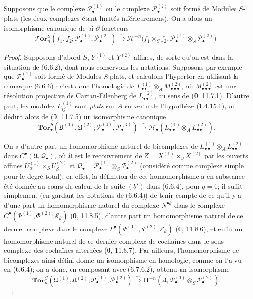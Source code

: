 \begin{proposition}[6.7.6]
Supposons que le complexe $\mathscr P_\bullet^{(1)}$ ou le complexe
$\mathscr P_\bullet^{(2)}$ soit formé de Modules $S$-plats (les deux complexes
étant limités inférieurement). On a alors un isomorphisme canonique de
bi-$\partial$-foncteurs
\[
  \boldsymbol{\mathscr{T}\!or}_n^S
  (f_1,f_2;\mathscr P_\bullet^{(1)},\mathscr P_\bullet^{(2)})
  \xrightarrow{\sim}
  \mathcal H^{-n}\bigl(f_1\times_S f_2,
    \mathscr P_\bullet^{(1)}\otimes_S\mathscr P_\bullet^{(2)}\bigr).
  \tag{6.7.6.1}\label{III.6.7.6.1.fr}
\]
\end{proposition}

\begin{proof}
Supposons d'abord $S$, $Y^{(1)}$ et $Y^{(2)}$ affines, de sorte qu'on est
dans la situation de (6.6.2), dont nous conservons les notations. Supposons par
exemple que $\mathscr P_\bullet^{(1)}$ soit formé de Modules $S$-plats, et
calculons l'hypertor en utilisant la remarque (6.6.6) : c'est donc l'homologie
de $L_{\bullet\bullet}^{(1)}\otimes_A M_{\bullet\bullet\bullet}^{(2)}$, où
$M_{\bullet\bullet\bullet}^{(2)}$ est une résolution projective de
Cartan-Eilenberg de $L_{\bullet\bullet}^{(2)}$, au sens de
(\textbf{0}, 11.7.1). D'autre part, les modules
$L_{ij}^{(1)}$ sont \emph{plats} sur $A$ en vertu de l'hypothèse (1.4.15.1);
on déduit alors de (\textbf{0}, 11.7.5) un isomorphisme canonique
\[
  \mathbf{Tor}_\bullet^S
  (\mathfrak U^{(1)},\mathfrak U^{(2)};
   \mathscr P_\bullet^{(1)},\mathscr P_\bullet^{(2)})
  \xrightarrow{\sim}
  \mathscr H_\bullet
  (L_{\bullet\bullet}^{(1)}\otimes_A L_{\bullet\bullet}^{(2)}).
  \tag{6.7.6.2}\label{III.6.7.6.2.fr}
\]

On a d'autre part un homomorphisme naturel de bicomplexes de
$L_{\bullet\bullet}^{(1)}\otimes_A L_{\bullet\bullet}^{(2)}$ dans
$C^\bullet(\mathfrak U,\mathscr Q_\bullet)$, où $\mathfrak U$ est le
recouvrement de $Z=X^{(1)}\times_S X^{(2)}$ par les ouverts affines
$U_\alpha^{(1)}\times_S U_\beta^{(2)}$ et
$\mathscr Q_\bullet
=\mathscr P_\bullet^{(1)}\otimes_S\mathscr P_\bullet^{(2)}$ (considéré comme
complexe simple pour le degré total); en effet, la définition de cet
homomorphisme a en substance été donnée au cours du calcul de la suite $(b')$
dans (6.6.4), pour $q=0$; il suffit simplement (en gardant les notations de
(6.6.4)) de tenir compte de ce qu'il y a d'une part un homomorphisme naturel
du complexe $N^{\bullet k}$ dans le complexe
$C^\bullet(\Phi^{(1)},\Phi^{(2)};\mathscr S_k)$
(\textbf{0}, 11.8.5), d'autre part un homomorphisme naturel de ce dernier
complexe dans le complexe
$P^\bullet(\Phi^{(1)},\Phi^{(2)};\mathscr S_k)$
(\textbf{0}, 11.8.6), et enfin un homomorphisme naturel de ce dernier
complexe de cochaînes dans le sous-complexe des cochaînes alternées
(\textbf{0}, 11.8.7). Par ailleurs, l'homomorphisme de bicomplexes ainsi
défini donne un isomorphisme en homologie, comme on l'a vu en (6.6.4); on a
donc, en composant avec (6.7.6.2), obtenu un isomorphisme
\[
  \mathbf{Tor}_n^S
  (\mathfrak U^{(1)},\mathfrak U^{(2)};
   \mathscr P_\bullet^{(1)},\mathscr P_\bullet^{(2)})
  \xrightarrow{\sim}
  \mathbf H^{-n}
  (\mathfrak U,\mathscr P_\bullet^{(1)}\otimes_S\mathscr P_\bullet^{(2)}).
  \tag{6.7.6.3}\label{III.6.7.6.3.fr}
\]


\end{proof}

